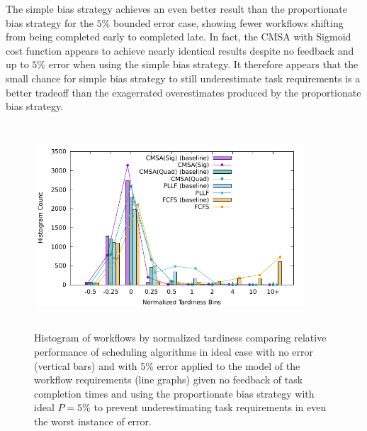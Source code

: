 \documentclass[10pt]{csce}
\begin{document}
The simple bias strategy achieves an even better result than the proportionate
bias strategy for the $5\%$ bounded error case, showing fewer workflows
shifting from being completed early to completed late.  In fact, the CMSA with
Sigmoid cost function appears to achieve nearly identical results despite no
feedback and up to $5\%$ error when using the simple bias strategy.  It
therefore appears that the small chance for simple bias strategy to still
underestimate task requirements is a better tradeoff than the exagerrated
overestimates produced by the proportionate bias strategy.

\begin{figure}
	\begin{center}
		\includegraphics[width=0.9\textwidth,height=3in]{figures/Histogram_All_CompleteMediumAllUniformError_WithRBias.pdf}
	\end{center}
	\caption{Histogram of workflows by normalized tardiness comparing
		relative performance of scheduling algorithms in ideal case with no
		error (vertical bars) and with 5\% error applied to the model of the
		workflow requirements (line graphs) given no feedback of task
		completion times and using the proportionate bias strategy with ideal
		$P=5\%$ to prevent underestimating task requirements in even the
		worst instance of error.}
	\label{fig:nofeedback-pbias-mederror}
\end{figure}
\end{document}
